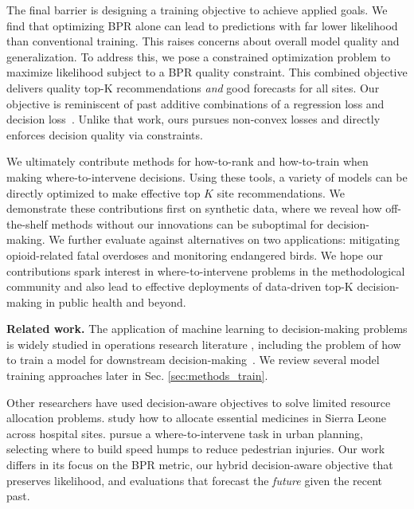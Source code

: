 The final barrier is designing a training objective to achieve applied goals.
We find that optimizing BPR alone can lead to predictions with far lower likelihood than conventional training. This raises concerns about overall model quality and generalization. To address this, we pose a constrained optimization problem to maximize likelihood subject to a BPR quality constraint. This combined objective delivers quality top-K recommendations \emph{and} good forecasts for all sites. 
Our objective is reminiscent of past additive combinations of a regression loss and decision loss~\citep{kao_directed_2009}. Unlike that work, ours pursues non-convex losses and directly enforces decision quality via constraints.


We ultimately contribute methods for how-to-rank and how-to-train when making where-to-intervene decisions. Using these tools, a variety of models can be directly optimized to make effective top $K$ site recommendations. 
We demonstrate these contributions first on synthetic data, where we reveal how off-the-shelf methods without our innovations can be suboptimal for decision-making.
We further evaluate against alternatives on two applications: mitigating opioid-related fatal overdoses and monitoring endangered birds. 
We hope our contributions spark interest in where-to-intervene problems in the methodological community and also lead to effective deployments of data-driven top-K decision-making in public health and beyond.

\textbf{Related work.}
The application of machine learning to decision-making problems is widely studied in operations research literature \citep{bertsimasPredictivePrescriptiveAnalytics2020a, sadana_survey_2025}, including the problem of how to train a model for downstream decision-making~\citep{mandi_decision-focused_2024}. 
We review several model training approaches later in Sec. \ref{sec:methods_train}.

Other researchers have used decision-aware objectives to solve limited resource allocation problems. 
\citet{chung_decision-aware_2022} study how to allocate essential medicines in
Sierra Leone across hospital sites.
\citet{gupta_decision-aware_2024} pursue a where-to-intervene task in urban planning,
selecting where to build speed humps to reduce pedestrian injuries. Our work differs in its focus on the BPR metric, our hybrid decision-aware objective that preserves likelihood, and evaluations that forecast the \emph{future} given the recent past.

